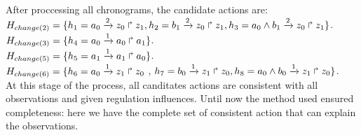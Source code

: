 After proccessing all chronograms, the candidate actions are: \\
$H_{change(2)} = \{ h_1=a_0\xrightarrow{2} z_0 \Rsh z_1,  h_2=b_1\xrightarrow{2} z_0 \Rsh z_1, h_3=a_0 \wedge b_1 \xrightarrow{2} z_0 \Rsh z_1 \}$.\\
$H_{change(3)} = \{ h_4=a_0\xrightarrow{1} a_0 \Rsh a_1  \}$. \\
$H_{change(5)} = \{ h_5=a_1\xrightarrow{1} a_1 \Rsh a_0  \}$. \\
$H_{change(6)} = \{ h_6=a_0\xrightarrow{1} z_1 \Rsh z_0$ , $  h_7=b_0\xrightarrow{1} z_1 \Rsh z_0, h_8=a_0 \wedge b_0 \xrightarrow{1} z_1 \Rsh z_0 \}$. \\

At this stage of the process, all canditates actions are consistent with all observations and given regulation influences.
Until now the method used ensured completeness: here we have the complete set of consistent action that can explain the observations.


